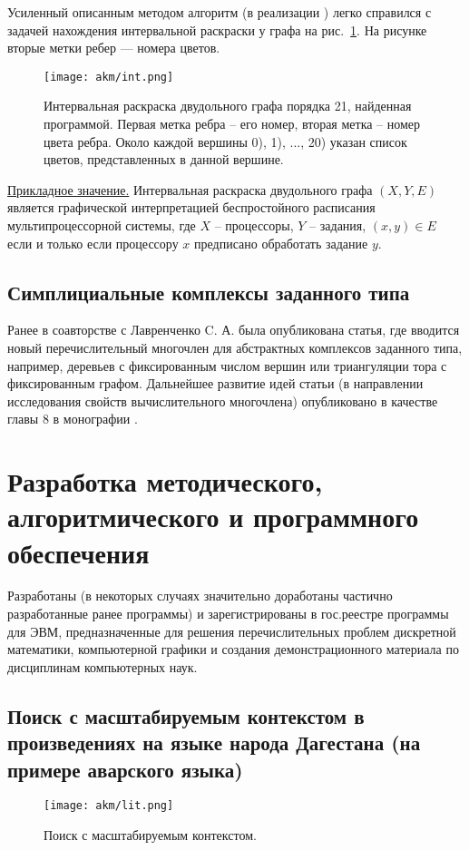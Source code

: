 Усиленный описанным методом алгоритм (в реализации \cite{akm-bib-m14, akm-bib-m15}) легко справился с задачей нахождения интервальной раскраски у графа на рис.~\ref{akm-fig-1}. На рисунке вторые метки ребер --- номера цветов.
\begin{figure}[h]
    \begin{center}
        \texttt{[image: akm/int.png]}
    \end{center}
    \caption{Интервальная раскраска двудольного графа порядка 21, найденная программой. Первая метка ребра -- его номер, вторая метка -- номер цвета ребра. Около каждой вершины 0), 1), ..., 20)  указан список цветов, представленных в данной вершине.}
    \label{akm-fig-1}
\end{figure}

\underline{Прикладное значение.} Интервальная раскраска двудольного графа $(X,Y,E)$ является графической интерпретацией беспростойного расписания мультипроцессорной системы,  где $X$ -- процессоры, $Y$ -- задания, $(x,y) \in E$ если и только если процессору $x$ предписано обработать задание $y$.


\subsection{Симплициальные комплексы заданного типа}

Ранее в соавторстве с Лавренченко C. А.  была опубликована статья, где вводится новый перечислительный многочлен для абстрактных комплексов заданного типа, например, деревьев с фиксированным числом вершин или триангуляции тора с фиксированным графом.
Дальнейшее развитие идей статьи (в направлении исследования свойств вычислительного многочлена) опубликовано в качестве главы 8 в монографии \cite{akm-bib-m3}.


\section{Разработка методического, алгоритмического и программного обеспечения}

Разработаны (в некоторых случаях значительно доработаны частично разработанные ранее программы) и зарегистрированы в гос.реестре программы для ЭВМ, предназначенные для решения перечислительных проблем дискретной математики, компьютерной графики и создания демонстрационного материала по дисциплинам компьютерных наук.


\subsection{Поиск с масштабируемым контекстом в произведениях на языке народа Дагестана (на примере аварского языка)}
\begin{figure}[h]
    \begin{center}
        \texttt{[image: akm/lit.png]}
    \end{center}
    \caption{Поиск с масштабируемым контекстом.}
\end{figure}


